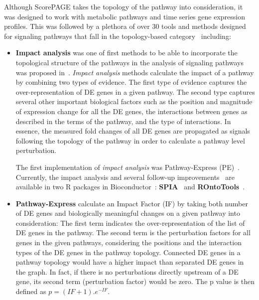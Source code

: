 \documentclass[Minh_PhD_thesis.tex]{subfiles}
\begin{document}
Although ScorePAGE takes the topology of the pathway into consideration, it was designed to work with metabolic pathways and time series gene expression profiles.
This was followed by a plethora of over 30 tools and methods designed for signaling pathways that fall in the topology-based category~\cite{mitrea2013methods} including: 

\begin{itemize}
\item \textbf{Impact analysis} was one of first methods to be able to incorporate the topological structure of the pathways in the analysis of signaling pathways was proposed in~\cite{draghici2007systems}. %
\textit{Impact analysis} methods calculate the impact of a pathway by combining two types of evidence.
The first type of evidence captures the over-representation of DE genes in a given pathway.  The second type captures several other important biological factors such as the position and magnitude of expression change for all the DE genes, the interactions between genes as described in the terms of the pathway, and the type of interactions. In essence, the measured fold changes of all DE genes are propagated as signals following the topology of the pathway in order to calculate a pathway level perturbation. 

The first implementation of \textit{impact analysis} was  Pathway-Express (PE)~\cite{draghici2007systems}.
Currently, the impact analysis and several follow-up improvements~\cite{voichita2012incorporating, ansari2017approach} are available in two R packages in Bioconductor~\cite{Yang:2002c}: \textbf{SPIA}~\cite{SPIAversion2.14.0} and \textbf{ROntoTools}~\cite{RontoToolsVersion1.2.0}.

\item \textbf{Pathway-Express} \cite{draghici2007systems, khatri:2007a} calculate an Impact Factor (IF) by taking both number of DE genes and biologically meaningful changes on a given pathway into consideration: The first term indicates the over-representation of the list of DE genes in the pathway. The second term is the perturbation factors for all genes in the given pathways, considering the positions and the interaction types of the DE genes in the pathway topology. Connected DE genes in a pathway topology would have a higher impact than separated DE genes in the graph. In fact, if there is no perturbations directly upstream of a DE gene, its second term (perturbation factor) would be zero. The p value is then defined as $p = (IF + 1).e^{-IF}$.


\end{itemize}
\end{document}
